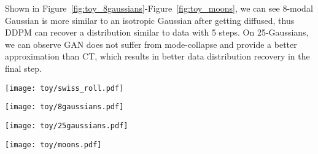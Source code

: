 \documentclass{article} \usepackage{iclr2023_conference,times}
\def\Figref#1{Figure~\ref{#1}}
\theoremstyle{plain}
\theoremstyle{definition}
\theoremstyle{remark}
\begin{document}
{Shown in \Figref{fig:toy_8gaussians}-\Figref{fig:toy_moons}, we can see 8-modal Gaussian is more similar to an isotropic Gaussian after getting diffused, thus DDPM can recover a distribution similar to data with 5 steps. On 25-Gaussians, we can observe GAN does not suffer from mode-collapse and provide a better approximation than CT, which results in better data distribution recovery in the final step. 


\begin{figure*}[t]
    \centering
    \texttt{[image: toy/swiss\_roll.pdf]}\vspace{-2mm}
    \caption{{\small A comparison of DDPM~\citep{ddpm}, TDPM-GAN, and TDPM-CT on Swiss Roll toy data. We show the effects of a truncated diffusion chain with length  and  ( and ). The first row displays the true distribution from  to . Each row below the first one represents the corresponding denoising distribution . DDPM assumes  and we can observe a gap between the true data distribution  and its generative distribution . TDPM learns , which can be observed to well approximate the true , which helps the model successfully recover the clean data distribution .
    Below each model, we report empirical KL divergence between data and generative distributions as the quantitative metric. More results on different toy data can be found in Appendix~\ref{appendix:results}.}}
    \label{fig:toy_swissroll}
    \vspace{-3mm}
\end{figure*}

\begin{figure*}[ht]
    \centering
    \texttt{[image: toy/8gaussians.pdf]}
    \caption{Analogous results to \Figref{fig:toy_swissroll} using 8-modal Gaussian data.}
    \label{fig:toy_8gaussians}
\end{figure*}

\begin{figure*}[t]
    \centering
    \texttt{[image: toy/25gaussians.pdf]}
    \caption{Analogous results to \Figref{fig:toy_swissroll} using 25-modal Gaussian data.}
    \label{fig:toy_25gaussians}
\end{figure*}

\begin{figure*}[t]
    \centering
    \texttt{[image: toy/moons.pdf]}
    \caption{Analogous results to \Figref{fig:toy_swissroll} using Double Moons data.}
    \label{fig:toy_moons}
\end{figure*}


}
\end{document}
